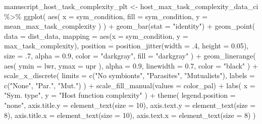 \documentclass[
]{book}
\newenvironment{Shaded}{\begin{snugshade}}{\end{snugshade}}
\newcommand{\AttributeTok}[1]{\textcolor[rgb]{0.77,0.63,0.00}{#1}}
\newcommand{\DecValTok}[1]{\textcolor[rgb]{0.00,0.00,0.81}{#1}}
\newcommand{\FloatTok}[1]{\textcolor[rgb]{0.00,0.00,0.81}{#1}}
\newcommand{\FunctionTok}[1]{\textcolor[rgb]{0.00,0.00,0.00}{#1}}
\newcommand{\NormalTok}[1]{#1}
\newcommand{\OtherTok}[1]{\textcolor[rgb]{0.56,0.35,0.01}{#1}}
\newcommand{\SpecialCharTok}[1]{\textcolor[rgb]{0.00,0.00,0.00}{#1}}
\newcommand{\StringTok}[1]{\textcolor[rgb]{0.31,0.60,0.02}{#1}}
\begin{document}
\begin{Shaded}
\begin{Highlighting}[]
\NormalTok{manuscript\_host\_task\_complexity\_plt }\OtherTok{\textless{}{-}}\NormalTok{ host\_max\_task\_complexity\_data\_ci }\SpecialCharTok{\%\textgreater{}\%}
  \FunctionTok{ggplot}\NormalTok{(}
    \FunctionTok{aes}\NormalTok{(}
      \AttributeTok{x =}\NormalTok{ sym\_condition,}
      \AttributeTok{fill =}\NormalTok{ sym\_condition,}
      \AttributeTok{y =}\NormalTok{ mean\_max\_task\_complexity}
\NormalTok{    )}
\NormalTok{  ) }\SpecialCharTok{+}
  \FunctionTok{geom\_bar}\NormalTok{(}\AttributeTok{stat =} \StringTok{"identity"}\NormalTok{) }\SpecialCharTok{+}
  \FunctionTok{geom\_point}\NormalTok{(}
    \AttributeTok{data =}\NormalTok{ dist\_data,}
    \AttributeTok{mapping =} \FunctionTok{aes}\NormalTok{(}\AttributeTok{x =}\NormalTok{ sym\_condition, }\AttributeTok{y =}\NormalTok{ max\_task\_complexity),}
    \AttributeTok{position =} \FunctionTok{position\_jitter}\NormalTok{(}\AttributeTok{width =}\NormalTok{ .}\DecValTok{4}\NormalTok{, }\AttributeTok{height =} \FloatTok{0.05}\NormalTok{),}
    \AttributeTok{size =}\NormalTok{ .}\DecValTok{7}\NormalTok{,}
    \AttributeTok{alpha =} \FloatTok{0.9}\NormalTok{,}
    \AttributeTok{color =} \StringTok{"darkgray"}\NormalTok{,}
    \AttributeTok{fill =} \StringTok{"darkgray"}
\NormalTok{  ) }\SpecialCharTok{+}
  \FunctionTok{geom\_linerange}\NormalTok{(}
    \FunctionTok{aes}\NormalTok{(}
      \AttributeTok{ymin =}\NormalTok{ lwr,}
      \AttributeTok{ymax =}\NormalTok{ upr}
\NormalTok{    ),}
    \AttributeTok{alpha =} \FloatTok{0.9}\NormalTok{,}
    \AttributeTok{linewidth =} \FloatTok{0.7}\NormalTok{,}
    \AttributeTok{color =} \StringTok{"black"}
\NormalTok{  ) }\SpecialCharTok{+}
  \FunctionTok{scale\_x\_discrete}\NormalTok{(}
    \AttributeTok{limits =} \FunctionTok{c}\NormalTok{(}\StringTok{"No symbionts"}\NormalTok{, }\StringTok{"Parasites"}\NormalTok{, }\StringTok{"Mutualists"}\NormalTok{),}
    \AttributeTok{labels =} \FunctionTok{c}\NormalTok{(}\StringTok{"None"}\NormalTok{, }\StringTok{"Par."}\NormalTok{, }\StringTok{"Mut."}\NormalTok{)}
\NormalTok{  ) }\SpecialCharTok{+}
  \FunctionTok{scale\_fill\_manual}\NormalTok{(}\AttributeTok{values =}\NormalTok{ color\_pal) }\SpecialCharTok{+}
  \FunctionTok{labs}\NormalTok{(}
    \AttributeTok{x =} \StringTok{"Sym. type"}\NormalTok{,}
    \AttributeTok{y =} \StringTok{"Host function complexity"}
\NormalTok{  ) }\SpecialCharTok{+}
  \FunctionTok{theme}\NormalTok{(}
    \AttributeTok{legend.position =} \StringTok{"none"}\NormalTok{,}
    \AttributeTok{axis.title.y =} \FunctionTok{element\_text}\NormalTok{(}\AttributeTok{size =} \DecValTok{10}\NormalTok{),}
    \AttributeTok{axis.text.y =} \FunctionTok{element\_text}\NormalTok{(}\AttributeTok{size =} \DecValTok{8}\NormalTok{),}
    \AttributeTok{axis.title.x =} \FunctionTok{element\_text}\NormalTok{(}\AttributeTok{size =} \DecValTok{10}\NormalTok{),}
    \AttributeTok{axis.text.x =} \FunctionTok{element\_text}\NormalTok{(}\AttributeTok{size =} \DecValTok{8}\NormalTok{)}
\NormalTok{  )}



\end{Highlighting}
\end{Shaded}
\end{document}
